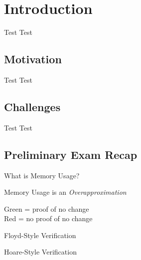 \section{Introduction}
\begin{frame}{Test}
  Test
\end{frame}


\subsection{Motivation}
\begin{frame}{Test}
  Test
\end{frame}


\subsection{Challenges}
\begin{frame}{Test}
  Test
\end{frame}


\subsection{Preliminary Exam Recap}
\begin{frame}{What is Memory Usage?}
\end{frame}

\begin{frame}{Memory Usage is an \emph{Overapproximation}}
  \centering

  Green = proof of no change \\
  Red = no proof of no change
\end{frame}

\begin{frame}{Floyd-Style Verification}
\end{frame}

\begin{frame}{Hoare-Style Verification}
\end{frame}
